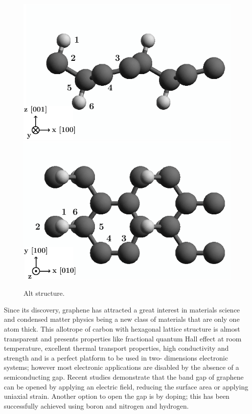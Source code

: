 \documentclass[prb,11pt,tightenlines,twocolumn,aps]{revtex4-1}
\begin{document}
\begin{figure}[ht!]
    \centering
    \includegraphics[width=\linewidth]{figures/altstruc2}
    \\
    \includegraphics[width=\linewidth]{figures/altstruc1}
    \caption{Alt structure.}
    \label{fig:alt-struc}
\end{figure}


Since its discovery, graphene has attracted a great interest in materials
science and condensed matter physics being a new class of materials that are
only one atom thick\cite{geimNM07}. This allotrope of carbon with hexagonal
lattice structure is almost transparent and presents properties like fractional
quantum Hall effect at room temperature, excellent thermal transport
properties, high conductivity and strength \cite{geimNM07, reinaNL08,
novoselov2S07, balandinNL08} and is a perfect platform to be used in two-
dimensions electronic systems; however most electronic applications are
disabled by the absence of a semiconducting gap. Recent studies demonstrate
that the band gap of graphene can be opened by applying an electric
field\cite{zhangN09}, reducing the surface area\cite{hanPRL07} or applying
uniaxial strain\cite{niACSN08}. Another option to open the gap is by doping;
this has been successfully achieved using boron and nitrogen\cite{guoIJ11} and
hydrogen\cite{eliasS09, guisingerNL09, samarakoonACSN10}.
\end{document}
